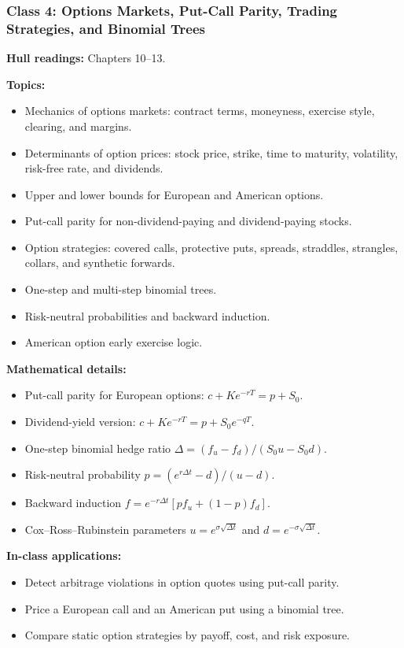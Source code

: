 \documentclass[11pt]{article}
\begin{document}
\subsubsection*{Class 4: Options Markets, Put-Call Parity, Trading Strategies, and Binomial Trees}
\textbf{Hull readings:} Chapters 10--13.

\textbf{Topics:}
\begin{itemize}
    \item Mechanics of options markets: contract terms, moneyness, exercise style, clearing, and margins.
    \item Determinants of option prices: stock price, strike, time to maturity, volatility, risk-free rate, and dividends.
    \item Upper and lower bounds for European and American options.
    \item Put-call parity for non-dividend-paying and dividend-paying stocks.
    \item Option strategies: covered calls, protective puts, spreads, straddles, strangles, collars, and synthetic forwards.
    \item One-step and multi-step binomial trees.
    \item Risk-neutral probabilities and backward induction.
    \item American option early exercise logic.
\end{itemize}

\textbf{Mathematical details:}
\begin{itemize}
    \item Put-call parity for European options: $c+Ke^{-rT}=p+S_0$.
    \item Dividend-yield version: $c+Ke^{-rT}=p+S_0e^{-qT}$.
    \item One-step binomial hedge ratio $\Delta=(f_u-f_d)/(S_0u-S_0d)$.
    \item Risk-neutral probability $p=(e^{r\Delta t}-d)/(u-d)$.
    \item Backward induction $f=e^{-r\Delta t}[pf_u+(1-p)f_d]$.
    \item Cox--Ross--Rubinstein parameters $u=e^{\sigma\sqrt{\Delta t}}$ and $d=e^{-\sigma\sqrt{\Delta t}}$.
\end{itemize}

\textbf{In-class applications:}
\begin{itemize}
    \item Detect arbitrage violations in option quotes using put-call parity.
    \item Price a European call and an American put using a binomial tree.
    \item Compare static option strategies by payoff, cost, and risk exposure.
\end{itemize}
\end{document}
